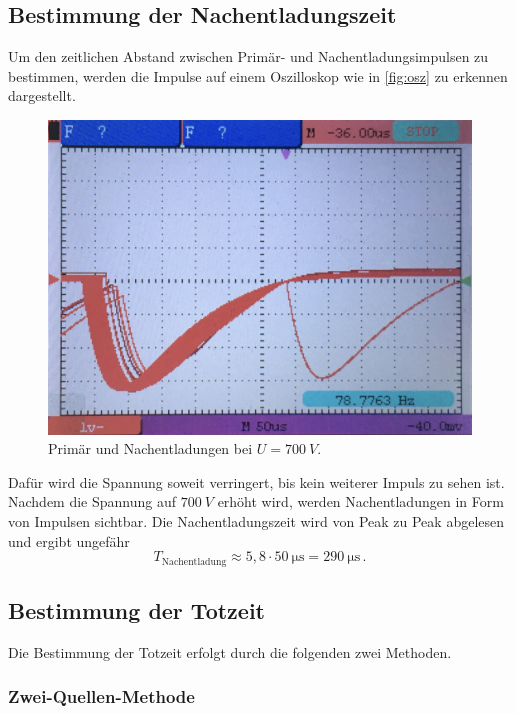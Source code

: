 \subsection{Bestimmung der Nachentladungszeit}

Um den zeitlichen Abstand zwischen Primär- und Nachentladungsimpulsen zu bestimmen,
werden die Impulse auf einem Oszilloskop wie in \autoref{fig:osz} zu erkennen dargestellt.
\begin{figure}
    \centering
    \includegraphics[width = 0.8\linewidth]{pictures/osz.jpg}
    \caption{Primär und Nachentladungen bei $U = \qty{700}{V}$.}
    \label{fig:osz}
\end{figure}

Dafür wird die Spannung soweit verringert, bis kein weiterer Impuls zu sehen ist.
Nachdem die Spannung auf $\qty{700}{V}$ erhöht wird, werden Nachentladungen in Form von Impulsen sichtbar.
Die Nachentladungszeit wird von Peak zu Peak abgelesen und ergibt ungefähr
\begin{equation*}
    T_\text{Nachentladung} \approx 5,8 \cdot \qty{50}{\micro\second} = \qty{290}{\micro\second} \, .
\end{equation*}


\subsection{Bestimmung der Totzeit}

Die Bestimmung der Totzeit erfolgt durch die folgenden zwei Methoden.

\subsubsection*{Zwei-Quellen-Methode}

